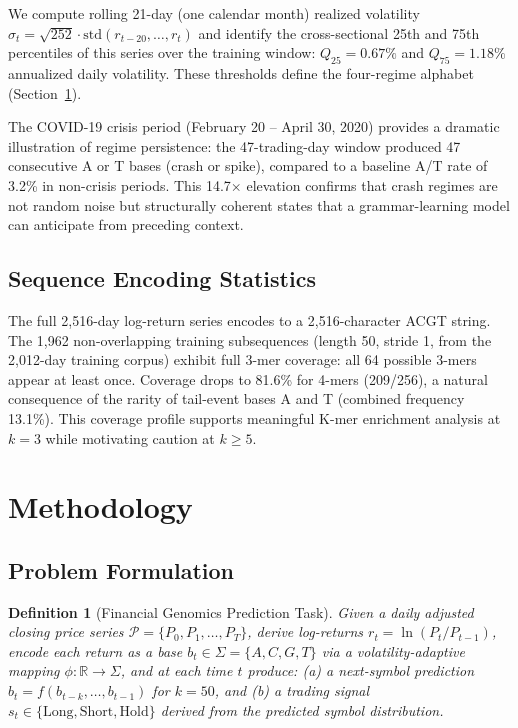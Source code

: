 \documentclass[11pt]{article}
\newtheorem{definition}{Definition}
\begin{document}
We compute rolling 21-day (one calendar month) realized volatility
$\hat{\sigma}_t = \sqrt{252} \cdot \text{std}(r_{t-20}, \ldots, r_t)$
and identify the cross-sectional 25th and 75th percentiles of this
series over the training window: $Q_{25} = 0.67\%$ and
$Q_{75} = 1.18\%$ annualized daily volatility.  These thresholds define
the four-regime alphabet (Section~\ref{sec:method}).

The COVID-19 crisis period (February 20 -- April 30, 2020) provides
a dramatic illustration of regime persistence: the 47-trading-day
window produced 47 consecutive A or T bases (crash or spike), compared
to a baseline A/T rate of 3.2\% in non-crisis periods.  This 14.7$\times$
elevation confirms that crash regimes are not random noise but
structurally coherent states that a grammar-learning model can
anticipate from preceding context.

\subsection{Sequence Encoding Statistics}

The full 2,516-day log-return series encodes to a 2,516-character ACGT
string.  The 1,962 non-overlapping training subsequences (length 50,
stride 1, from the 2,012-day training corpus) exhibit full 3-mer
coverage: all 64 possible 3-mers appear at least once.  Coverage drops
to 81.6\% for 4-mers (209/256), a natural consequence of the rarity of
tail-event bases A and T (combined frequency 13.1\%).  This coverage
profile supports meaningful K-mer enrichment analysis at $k = 3$
while motivating caution at $k \geq 5$.

\section{Methodology}
\label{sec:method}

\subsection{Problem Formulation}

\begin{definition}[Financial Genomics Prediction Task]
Given a daily adjusted closing price series
$\mathcal{P} = \{P_0, P_1, \ldots, P_T\}$, derive log-returns
$r_t = \ln(P_t / P_{t-1})$, encode each return as a base
$b_t \in \Sigma = \{A, C, G, T\}$ via a volatility-adaptive mapping
$\phi: \mathbb{R} \to \Sigma$, and at each time $t$ produce:
(a) a next-symbol prediction $\hat{b}_t = f(b_{t-k}, \ldots, b_{t-1})$
for $k = 50$, and
(b) a trading signal $s_t \in \{\text{Long}, \text{Short}, \text{Hold}\}$
derived from the predicted symbol distribution.
\end{definition}
\end{document}
